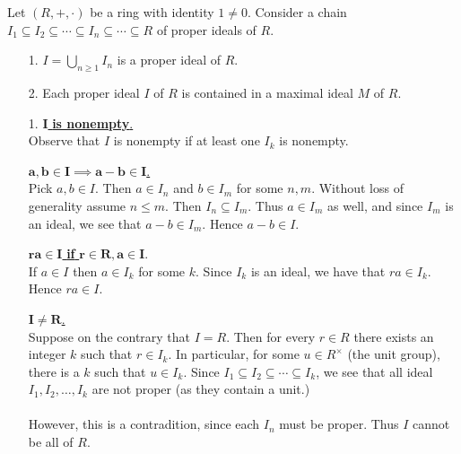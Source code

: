     \begin{thm}
        Let $(R, +, \cdot)$ be a ring with identity $1 \ne 0$.
        Consider a chain $I_1 \subseteq I_2 \subseteq \cdots \subseteq
        I_n \subseteq \cdots \subseteq R$ of proper ideals of $R$.
        \begin{itemize}
            \item[1.] $\displaystyle I = \bigcup_{n \ge 1}I_n$ is a proper
            ideal of $R$. 

            \item[2.] Each proper ideal $I$ of $R$ is
            contained in a maximal ideal $M$ of $R$.
        \end{itemize}
    \end{thm}

    \begin{prf}
        \begin{itemize}
            \item[1.]
            \underline{$\bm{I}$ \textbf{is nonempty}.}\\[1.2ex]
            Observe that $I$ is nonempty if at least one $I_k$ is
            nonempty. 
    
            \noindent\underline{$\bm{a, b \in I \implies a -b \in I}$.}\\[1.2ex]
            Pick $a, b \in I$. Then $a \in I_n$ and $b \in I_m$ for some
            $n, m$. Without loss of generality assume $n \le m$. Then $I_n
            \subseteq I_m$. Thus $a \in I_m$ as well, and since $I_m$ is
            an ideal, we see that $a - b \in I_m$. Hence $a - b \in I$. 
    
            \noindent\underline{$\bm{ra \in I}$ \textbf{if} $\bm{r \in R,
            a \in I}$}.\\[1.2ex]
            If $a \in I$ then $a \in I_k$ for some $k$. Since $I_k$ is an
            ideal, we have that $ra \in I_k$. Hence $ra \in I$. 
    
            \noindent\underline{$\bm{I \ne R}$.}\\[1.2ex]
            Suppose on the contrary that $I = R$. Then for every $r \in R$
            there exists an integer $k$ such that $r \in I_k$. In
            particular, for some $u \in R^{\times}$ (the unit group),
            there is a $k$ such that $u \in I_k$. Since $I_1 \subseteq I_2
            \subseteq
            \cdots \subseteq I_k$, we see that all ideal $I_1, I_2,
            \dots, I_k$ are not proper (as they contain a unit.)
            \\
            \\
            However, this is a contradition, since each $I_n$ must be
            proper. Thus $I$ cannot be all of $R$. 
    

\end{itemize}
\end{prf}
